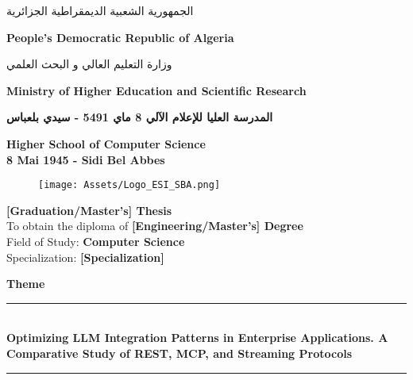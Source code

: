 \begin{titlepage}

\centering
\begin{Arabic}
    {\normalsize \textsc{الجمهورية الشعبية الديمقراطية الجزائرية}} \\[1mm]
\end{Arabic}
{\normalsize \textbf{People's Democratic Republic of Algeria}} \\[1mm]

\begin{Arabic}
    {\normalsize \textsc{وزارة التعليم العالي و البحث العلمي}} \\[1mm]
\end{Arabic}
{\normalsize \textbf{Ministry of Higher Education and Scientific Research}}\\

\begin{Arabic}
    {\normalsize \textbf{المدرسة العليا للإعلام الآلي \hspace{0.3mm} 8 ماي 5491 - سيدي بلعباس}}\\[1mm]
\end{Arabic}
{\normalsize \textbf{Higher School of Computer Science \\[1mm] 8 Mai 1945 - Sidi Bel Abbes}}\\

\vspace{0.5cm}


\begin{figure}[ht]
    \centering
    \texttt{[image: Assets/Logo\_ESI\_SBA.png]}
\end{figure}

\vspace{0.3cm}

\Large \textbf{[Graduation/Master's] Thesis} \\
\vspace{0.4cm}
{\normalsize To obtain the diploma of \textbf{[Engineering/Master's] Degree}} \\
{\normalsize Field of Study: \textbf{Computer Science}} \\
{\normalsize Specialization: \textbf{[Specialization]}} \\
\vspace{0.4cm}

\Large \textbf{Theme}\\
\rule{15cm}{0.2mm}\\
\vspace{0.4cm}
\centering
{\textbf{Optimizing LLM Integration Patterns in Enterprise Applications. A Comparative Study of REST, MCP, and Streaming Protocols}}\\
\rule{15cm}{0.2mm}\\
\vspace{0.2cm}


\end{titlepage}
